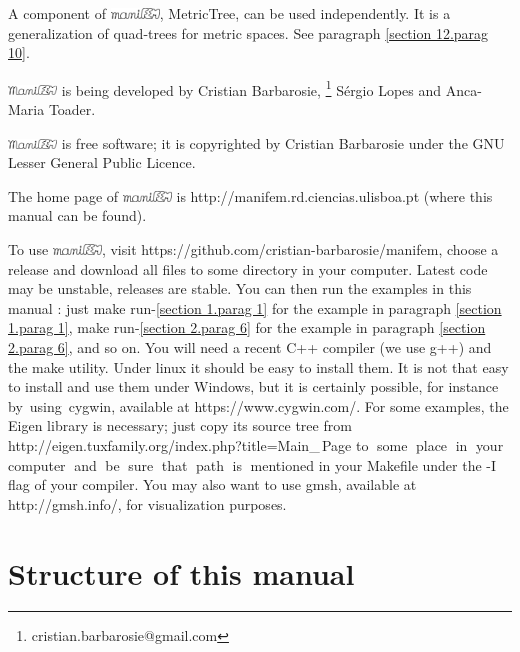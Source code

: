 \documentclass[a4paper]{scrreprt}
\def\numb{}
\newcommand\ManiFEM{\leavevmode\hbox{\includegraphics[width=13mm]{manifem-large}}}
\newcommand\maniFEM{\leavevmode\hbox{\includegraphics[width=13mm]{manifem-small}}}
\renewcommand\tt{\normalfont\ttfamily}
\begin{document}
A component of \maniFEM, {\small\tt MetricTree}, can be used independently.
It is a generalization of quad-trees for metric spaces.
See paragraph \ref{\numb section 12.\numb parag 10}.

{\ManiFEM} is being developed by Cristian Barbarosie,%
\footnote {\small\tt cristian.barbarosie@gmail.com}
S\'ergio Lopes and Anca-Maria Toader.

{\ManiFEM} is free software; it is copyrighted by Cristian Barbarosie
under the GNU Lesser General Public Licence.

The home page of {\maniFEM} is {\small\tt http://manifem.rd.ciencias.ulisboa.pt}
(where this manual can be found).

To use \maniFEM, visit {\small\tt https://github.com/cristian-barbarosie/manifem},
choose a release and download all files to some directory in your computer.
Latest code may be unstable, releases are stable.
You can then run the examples in this manual :
just {\small\tt make run-\ref{\numb section 1.\numb parag 1}}
for the example in paragraph \ref{\numb section 1.\numb parag 1},
{\small\tt make run-\ref{\numb section 2.\numb parag 6}}
for the example in paragraph \ref{\numb section 2.\numb parag 6}, and so on.
You will need a recent {\tt C++} compiler (we use {\tt g++}) and the {\tt make} utility.
Under linux it should be easy to install them.
It is not that easy to install and use them under Windows, but it is certainly possible,
for instance \hbox{by using {\small\tt cygwin}}, available at {\small\tt https://www.cygwin.com/}.
For some examples, the {\small\tt Eigen} library is necessary; just copy its source tree
from {\small\tt http://eigen.tuxfamily.org/index.php?title=Main\_\,Page}
to $\;$some $\;$place $\;$in $\;$your $\;$computer $\;$and $\;$be $\;$sure $\;$that
$\;$path $\;$is $\;$mentioned in your {\small\tt Makefile}
under the {\small\tt -I} flag of your compiler.
You may also want to use {\tt gmsh}, available at {\small\tt http://gmsh.info/},
for visualization purposes.

\section*{Structure of this manual}
\end{document}

